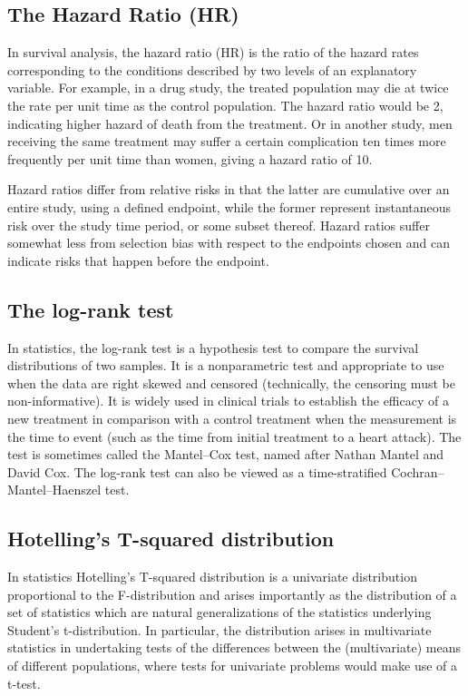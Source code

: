 \subsection*{The Hazard Ratio (HR)}
In survival analysis, the hazard ratio (HR) is the ratio of the hazard rates corresponding to the conditions described by two levels of an explanatory variable. For example, in a drug study, the treated population may die at twice the rate per unit time as the control population. The hazard ratio would be 2, indicating higher hazard of death from the treatment. Or in another study, men receiving the same treatment may suffer a certain complication ten times more frequently per unit time than women, giving a hazard ratio of 10.
 
Hazard ratios differ from relative risks in that the latter are cumulative over an entire study, using a defined endpoint, while the former represent instantaneous risk over the study time period, or some subset thereof. Hazard ratios suffer somewhat less from selection bias with respect to the endpoints chosen and can indicate risks that happen before the endpoint.
\newpage
\subsection*{The log-rank test}
In statistics, the log-rank test is a hypothesis test to compare the survival distributions of two samples. It is a nonparametric test and appropriate to use when the data are right skewed and censored (technically, the censoring must be non-informative). It is widely used in clinical trials to establish the efficacy of a new treatment in comparison with a control treatment when the measurement is the time to event (such as the time from initial treatment to a heart attack). The test is sometimes called the Mantel–Cox test, named after Nathan Mantel and David Cox. 
The log-rank test can also be viewed as a time-stratified Cochran–Mantel–Haenszel test.
\newpage
\subsection*{Hotelling's T-squared distribution}
In statistics Hotelling's T-squared distribution is a univariate distribution proportional to the F-distribution and arises importantly as the distribution of a set of statistics which are natural generalizations of the statistics underlying Student's t-distribution. In particular, the distribution arises in multivariate statistics in undertaking tests of the differences between the (multivariate) means of different populations, where tests for univariate problems would make use of a t-test.

